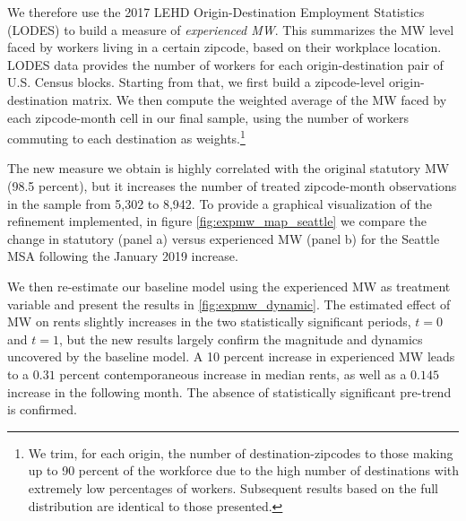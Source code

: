 We therefore use the 2017 LEHD Origin-Destination Employment Statistics (LODES) to build a measure of \textit{experienced MW}. This summarizes the MW level faced by workers living in a certain zipcode, based on their workplace location. LODES data provides the number of workers for each origin-destination pair of U.S. Census blocks. Starting from that, we first build a zipcode-level origin-destination matrix. We then compute the weighted average of the MW faced by each zipcode-month cell in our final sample, using the number of workers commuting to each destination as weights.\footnote{We trim, for each origin, the number of destination-zipcodes to those making up to 90 percent of the workforce due to the high number of destinations with extremely low percentages of workers. Subsequent results based on the full distribution are identical to those presented.} 

The new measure we obtain is highly correlated with the original statutory MW (98.5 percent), but it increases the number of treated zipcode-month observations in the sample from 5,302 to 8,942. To provide a graphical visualization of the refinement implemented,  
in figure \ref{fig:expmw_map_seattle} we compare the change in statutory (panel a) versus experienced MW (panel b) for the Seattle MSA following the January 2019 increase. 

We then re-estimate our baseline model using the experienced MW as treatment variable and present the results in \autoref{fig:expmw_dynamic}. The estimated effect of MW on rents slightly increases in the two statistically significant periods,  $t=0$ and $t=1$, but the new results largely confirm the magnitude and dynamics uncovered by the baseline model. A 10 percent increase in experienced MW leads to a $0.31$ percent contemporaneous increase in median rents, as well as a $0.145$ increase in the following month. The absence of statistically significant pre-trend is confirmed.    




